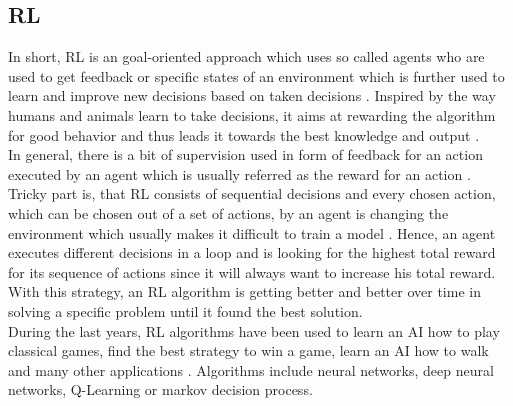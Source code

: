 \documentclass[MGS,Master,english]{twbook}%
\begin{document}
\subsection{\acl{RL}}
In short, \ac{RL} is an goal-oriented approach which uses so called agents who are used to get feedback or specific states of an environment which is further used to learn and improve new decisions based on taken decisions \cite{ml::book::developer}. Inspired by the way humans and animals learn to take decisions, it aims at rewarding the algorithm for good behavior and thus leads it towards the best knowledge and output \cite{ai::book}. \\
In general, there is a bit of supervision used in form of feedback for an action executed by an agent which is usually referred as the reward for an action \cite{ml::book::statistics}. Tricky part is, that RL consists of sequential decisions and every chosen action, which can be chosen out of a set of actions, by an agent is changing the environment which usually makes it difficult to train a model \cite{ml::book::statistics}. Hence, an agent executes different decisions in a loop and is looking for the highest total reward for its sequence of actions since it will always want to increase his total reward. \cite{ai::book} With this strategy, an RL algorithm is getting better and better over time in solving a specific problem until it found the best solution.\\
During the last years, RL algorithms have been used to learn an AI how to play classical games, find the best strategy to win a game, learn an AI how to walk and many other applications \cite{ml::book::algorithms}. Algorithms include neural networks, deep neural networks, Q-Learning or markov decision process. \cite{ml::book::statistics}
\end{document}
